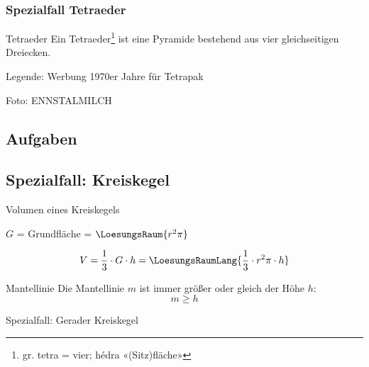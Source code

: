 \subsubsection{Spezialfall Tetraeder}

\begin{definition}{Tetraeder}{}
  Ein Tetraeder\footnote{gr. tetra = vier; hédra «(Sitz)fläche»} ist
  eine Pyramide bestehend aus vier gleichseitigen Dreiecken.
\end{definition}


\begin{center}{\small{Legende: Werbung 1970er Jahre für Tetrapak}}\end{center}
\begin{center}\tiny{Foto: ENNSTALMILCH}\end{center}
\subsection*{Aufgaben}




\newpage

\subsection{Spezialfall: Kreiskegel}



\begin{gesetz}{Volumen eines Kreiskegels}{}

  $G$ = Grundfläche = $\LoesungsRaum{r^2\pi}$

  $$V = \frac13\cdot{} G\cdot{}h = \LoesungsRaumLang{\frac13 \cdot{} r^2\pi \cdot{} h}$$
\end{gesetz}

\begin{bemerkung}{Mantellinie}{}
  Die Mantellinie $m$ ist immer größer oder gleich der Höhe $h$:
  $$m \ge{} h$$
\end{bemerkung}

Spezialfall: Gerader Kreiskegel

